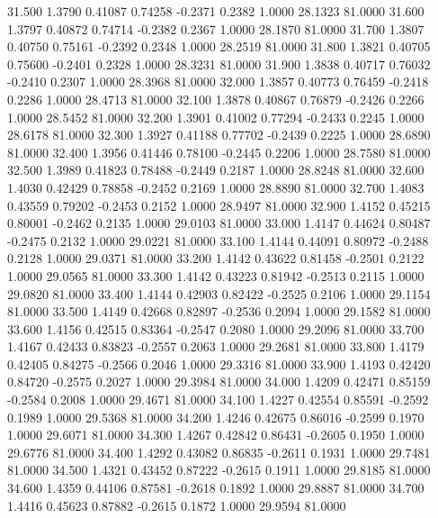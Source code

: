   31.500   1.3790   0.41087   0.74258  -0.2371   0.2382   1.0000  28.1323  81.0000
  31.600   1.3797   0.40872   0.74714  -0.2382   0.2367   1.0000  28.1870  81.0000
  31.700   1.3807   0.40750   0.75161  -0.2392   0.2348   1.0000  28.2519  81.0000
  31.800   1.3821   0.40705   0.75600  -0.2401   0.2328   1.0000  28.3231  81.0000
  31.900   1.3838   0.40717   0.76032  -0.2410   0.2307   1.0000  28.3968  81.0000
  32.000   1.3857   0.40773   0.76459  -0.2418   0.2286   1.0000  28.4713  81.0000
  32.100   1.3878   0.40867   0.76879  -0.2426   0.2266   1.0000  28.5452  81.0000
  32.200   1.3901   0.41002   0.77294  -0.2433   0.2245   1.0000  28.6178  81.0000
  32.300   1.3927   0.41188   0.77702  -0.2439   0.2225   1.0000  28.6890  81.0000
  32.400   1.3956   0.41446   0.78100  -0.2445   0.2206   1.0000  28.7580  81.0000
  32.500   1.3989   0.41823   0.78488  -0.2449   0.2187   1.0000  28.8248  81.0000
  32.600   1.4030   0.42429   0.78858  -0.2452   0.2169   1.0000  28.8890  81.0000
  32.700   1.4083   0.43559   0.79202  -0.2453   0.2152   1.0000  28.9497  81.0000
  32.900   1.4152   0.45215   0.80001  -0.2462   0.2135   1.0000  29.0103  81.0000
  33.000   1.4147   0.44624   0.80487  -0.2475   0.2132   1.0000  29.0221  81.0000
  33.100   1.4144   0.44091   0.80972  -0.2488   0.2128   1.0000  29.0371  81.0000
  33.200   1.4142   0.43622   0.81458  -0.2501   0.2122   1.0000  29.0565  81.0000
  33.300   1.4142   0.43223   0.81942  -0.2513   0.2115   1.0000  29.0820  81.0000
  33.400   1.4144   0.42903   0.82422  -0.2525   0.2106   1.0000  29.1154  81.0000
  33.500   1.4149   0.42668   0.82897  -0.2536   0.2094   1.0000  29.1582  81.0000
  33.600   1.4156   0.42515   0.83364  -0.2547   0.2080   1.0000  29.2096  81.0000
  33.700   1.4167   0.42433   0.83823  -0.2557   0.2063   1.0000  29.2681  81.0000
  33.800   1.4179   0.42405   0.84275  -0.2566   0.2046   1.0000  29.3316  81.0000
  33.900   1.4193   0.42420   0.84720  -0.2575   0.2027   1.0000  29.3984  81.0000
  34.000   1.4209   0.42471   0.85159  -0.2584   0.2008   1.0000  29.4671  81.0000
  34.100   1.4227   0.42554   0.85591  -0.2592   0.1989   1.0000  29.5368  81.0000
  34.200   1.4246   0.42675   0.86016  -0.2599   0.1970   1.0000  29.6071  81.0000
  34.300   1.4267   0.42842   0.86431  -0.2605   0.1950   1.0000  29.6776  81.0000
  34.400   1.4292   0.43082   0.86835  -0.2611   0.1931   1.0000  29.7481  81.0000
  34.500   1.4321   0.43452   0.87222  -0.2615   0.1911   1.0000  29.8185  81.0000
  34.600   1.4359   0.44106   0.87581  -0.2618   0.1892   1.0000  29.8887  81.0000
  34.700   1.4416   0.45623   0.87882  -0.2615   0.1872   1.0000  29.9594  81.0000
